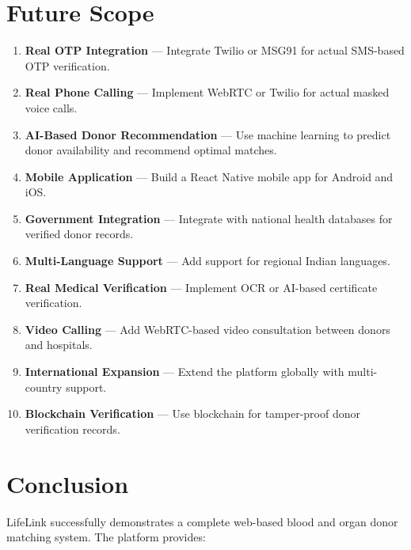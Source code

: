 \documentclass[12pt,a4paper]{article}
\begin{document}
\section{Future Scope}

\begin{enumerate}[leftmargin=*]
    \item \textbf{Real OTP Integration} --- Integrate Twilio or MSG91 for actual SMS-based OTP verification.
    \item \textbf{Real Phone Calling} --- Implement WebRTC or Twilio for actual masked voice calls.
    \item \textbf{AI-Based Donor Recommendation} --- Use machine learning to predict donor availability and recommend optimal matches.
    \item \textbf{Mobile Application} --- Build a React Native mobile app for Android and iOS.
    \item \textbf{Government Integration} --- Integrate with national health databases for verified donor records.
    \item \textbf{Multi-Language Support} --- Add support for regional Indian languages.
    \item \textbf{Real Medical Verification} --- Implement OCR or AI-based certificate verification.
    \item \textbf{Video Calling} --- Add WebRTC-based video consultation between donors and hospitals.
    \item \textbf{International Expansion} --- Extend the platform globally with multi-country support.
    \item \textbf{Blockchain Verification} --- Use blockchain for tamper-proof donor verification records.
\end{enumerate}

\section{Conclusion}

LifeLink successfully demonstrates a complete web-based blood and organ donor matching system. The platform provides:
\end{document}
